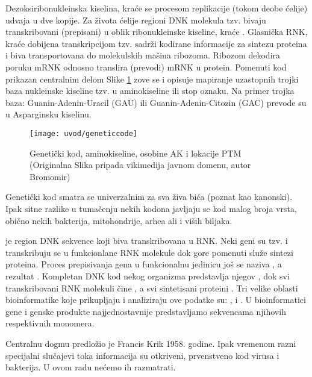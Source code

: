 Dezoksiribonukleinska kiselina, kraće  se procesom replikacije
(tokom deobe ćelije) udvaja u dve kopije. Za života ćelije regioni DNK
molekula tzv.  bivaju transkribovani (prepisani) u oblik
ribonukleinske kiseline, kraće . Glasnička RNK, kraće 
dobijena transkripcijom tzv.  sadrži kodirane informacije
za sintezu proteina i biva transportovana do molekulskih mašina ribozoma.
Ribozom dekodira poruku mRNK odnosno translira (prevodi) mRNK  u protein.
Pomenuti kod prikazan centralnim delom Slike \ref{fig:kod} zove se
 i opisuje mapiranje uzastopnih trojki baza nukleinske
kiseline tzv.  u aminokiseline ili stop oznaku. Na primer
trojka baza: Guanin-Adenin-Uracil (GAU) ili Guanin-Adenin-Citozin (GAC) prevode
su u Asparginsku kiselinu.

\begin{figure}[]
\centering
\hspace*{-2.3cm} 
\texttt{[image: uvod/geneticcode]}
\caption { Genetički kod, aminokiseline, osobine AK i lokacije PTM\\
  \footnotesize
(Originalna Slika pripada vikimedija javnom domenu, autor Bromomir)}
\label{fig:kod}
\end{figure}

\clearpage

Genetički kod smatra se univerzalnim za sva živa bića (poznat kao kanonski). Ipak sitne razlike u
tumačenju nekih kodona javljaju se kod malog broja vrsta, obično nekih
bakterija, mitohondrije, arhea ali i viših biljaka.

 je region DNK sekvence
koji biva transkribovana u RNK.  Neki geni su tzv.   i
transkribuju se u funkcionlane RNK molekule dok gore pomenuti 
služe sintezi proteina.  Proces prepisivanja gena u funkcionalnu jedinicu još
se naziva , a rezultat .
Kompletan DNK kod nekog organizma predstavlja njegov
, dok  svi transkribovani RNK molekuli čine ,
a svi sintetisani proteini .  Tri velike oblasti
bioinformatike koje prikupljaju i analiziraju ove podatke su:
,  i .
U bioinformatici gene i genske produkte najjednostavnije predstavljamo
sekvencama njihovih respektivnih monomera.


Centralnu dogmu predložio je Francis Krik 1958. godine. Ipak vremenom 
razni specijalni slučajevi toka informacija su otkriveni, prvenstveno kod
virusa i bakterija. U ovom radu nećemo ih razmatrati.

